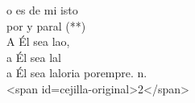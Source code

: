\begin{cancion}%
	o es de mi isto\\
	por  y paral (**)\\
	A Él sea lao,\\
	a Él sea lal  \\
	a Él sea laloria porempre. n.\\
<span id=cejilla-original>2</span>\\
\end{cancion}%
